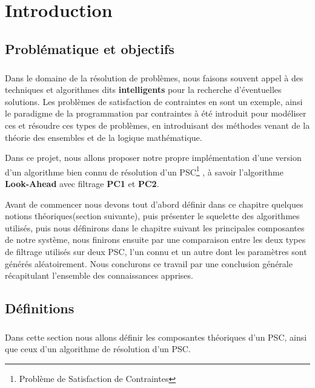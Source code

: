 \documentclass[12pt]{report}
\begin{document}
 
\tableofcontents
\listoffigures
\listoftables


\newpage

\chapter{Introduction}
	\section{Problématique et objectifs }
	\paragraph{}
	Dans le domaine de la résolution de problèmes, nous faisons souvent appel à des 
	techniques et algorithmes dits \textbf{intelligents} pour la recherche d'éventuelles
	solutions. Les problèmes de satisfaction de contraintes en sont un exemple, ainsi le
	paradigme de la  programmation par contraintes à été introduit pour modéliser ces 
	et résoudre ces types de problèmes, en introduisant des méthodes venant de la théorie
	des ensembles et de la logique mathématique.
	\par 
	Dans ce projet, nous allons proposer notre propre implémentation d'une version d'un 
	algorithme bien connu de résolution d'un PSC\footnote{Problème de Satisfaction de Contraintes}
	, à savoir l'algorithme \textbf{Look-Ahead} avec filtrage \textbf{PC1 }et \textbf{PC2}.
	\par 
	Avant de commencer nous devons tout d'abord définir dans ce chapitre quelques notions
	théoriques(section suivante), puis présenter le squelette des algorithmes utilisés,
	puis nous définirons dans le chapitre suivant les principales composantes de notre
	système, nous finirons ensuite par une comparaison entre les deux types de filtrage
	utilisés sur deux PSC, l'un connu et un autre dont les paramètres sont générés 
	aléatoirement. Nous conclurons ce travail par une conclusion générale récapitulant 
	l'ensemble des connaissances apprises.

	\section{Définitions}
	\paragraph{}
	Dans cette section nous allons définir les composantes théoriques d'un PSC, ainsi que 
	ceux d'un algorithme de résolution d'un PSC.
	
\end{document}
